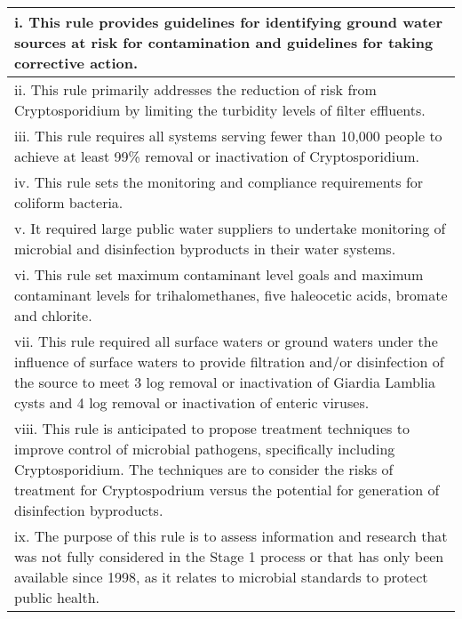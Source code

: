\documentclass[10pt]{article}
\begin{document}
\begin{table}[ht]
\begin{tabular}{p{5cm}}
\end{tabular}
\renewcommand{\arraystretch}{1.2}
\begin{tabular}{p{9cm}}
i.  This   rule provides guidelines for identifying ground water sources at risk for   contamination and guidelines for taking corrective action.                                                                                                                                                \\
\hline 
ii.  This rule primarily addresses the reduction of risk from Cryptosporidium by limiting the   turbidity levels of filter effluents.                                                                                                                                                             \\
\hline 
iii.  This rule requires all systems serving fewer than 10,000 people   to achieve at least 99\% removal or inactivation of Cryptosporidium.                                                                                                                                                       \\
\hline 
iv.  This rule sets the monitoring and compliance requirements for   coliform bacteria.                                                                                                                                                                                                           \\
\hline 
v.  It required large public water suppliers to undertake monitoring   of microbial and disinfection byproducts in their water systems.                                                                                                                                                          \\
\hline 
vi.  This rule set maximum contaminant level goals and maximum   contaminant levels for trihalomethanes, five haleocetic acids, bromate and   chlorite.                                                                                                                                           \\
\hline 
vii.  This rule required all surface waters or ground waters under the   influence of surface waters to provide filtration and/or disinfection of the   source to meet 3 log removal or inactivation of Giardia   Lamblia cysts and 4 log removal or inactivation of   enteric viruses.           \\
\hline 
viii.  This rule is anticipated to propose treatment techniques to   improve control of microbial pathogens, specifically including Cryptosporidium. The techniques are   to consider the risks of treatment for Cryptospodrium   versus the potential for generation of   disinfection byproducts. \\
\hline 
ix.  The purpose of this rule is to assess information and research   that was not fully considered in the Stage 1 process or that has only been   available since 1998, as it relates to microbial standards to protect public   health.                                                        \\
\hline 
\end{tabular}
\end{table}
\end{document}
